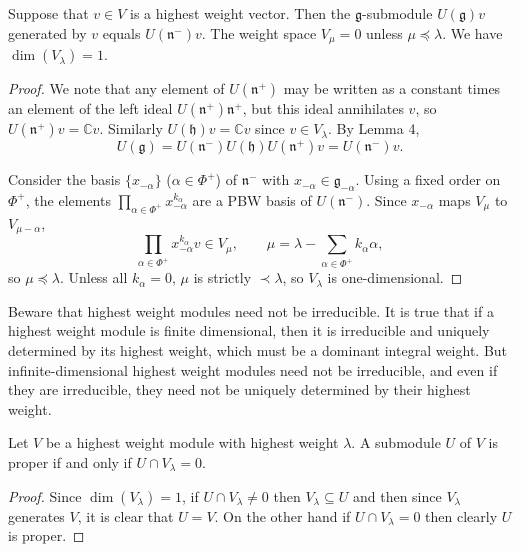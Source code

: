 \documentclass[12pt]{article}
\begin{document}
\begin{proposition}
    Suppose that $v \in V$ is a highest weight vector. Then the $\mathfrak{g}$-submodule $U(\mathfrak{g})v$ generated by $v$ equals $U(\mathfrak{n}^-)v$. The weight space $V_\mu = 0$ unless $\mu \preceq \lambda$. We have $\dim(V_\lambda) = 1$.
\end{proposition}

\begin{proof}
    We note that any element of $U(\mathfrak{n}^+)$ may be written as a constant times an element of the left ideal $U(\mathfrak{n}^+)\mathfrak{n}^+$, but this ideal annihilates $v$, so $U(\mathfrak{n}^+)v = \mathbb{C}v$. Similarly $U(\mathfrak{h})v = \mathbb{C}v$ since $v \in V_\lambda$. By Lemma 4,
    \[
        U(\mathfrak{g}) = U(\mathfrak{n}^-)U(\mathfrak{h})U(\mathfrak{n}^+)v = U(\mathfrak{n}^-)v.
    \]

    Consider the basis $\{x_{-\alpha}\}$ ($\alpha \in \Phi^+$) of $\mathfrak{n}^-$ with $x_{-\alpha} \in \mathfrak{g}_{-\alpha}$. Using a fixed order on $\Phi^+$, the elements $\prod_{\alpha \in \Phi^+} x_{-\alpha}^{k_\alpha}$ are a PBW basis of $U(\mathfrak{n}^-)$. Since $x_{-\alpha}$ maps $V_\mu$ to $V_{\mu-\alpha}$,
    \[
        \prod_{\alpha \in \Phi^+} x_{-\alpha}^{k_\alpha} v \in V_\mu,
        \qquad \mu = \lambda - \sum_{\alpha \in \Phi^+} k_\alpha \alpha,
    \]
    so $\mu \preceq \lambda$. Unless all $k_\alpha = 0$, $\mu$ is strictly $\prec \lambda$, so $V_\lambda$ is one-dimensional.
\end{proof}

\begin{remark}
    Beware that highest weight modules need not be irreducible. It is true that if a highest weight module is finite dimensional, then it is irreducible and uniquely determined by its highest weight, which must be a dominant integral weight. But infinite-dimensional highest weight modules need not be irreducible, and even if they are irreducible, they need not be uniquely determined by their highest weight.
\end{remark}

\begin{proposition}
    Let $V$ be a highest weight module with highest weight $\lambda$. A submodule $U$ of $V$ is proper if and only if $U \cap V_\lambda = 0$.
\end{proposition}

\begin{proof}
    Since $\dim(V_\lambda) = 1$, if $U \cap V_\lambda \neq 0$ then $V_\lambda \subseteq U$ and then since $V_\lambda$ generates $V$, it is clear that $U = V$. On the other hand if $U \cap V_\lambda = 0$ then clearly $U$ is proper.
\end{proof}
\end{document}
